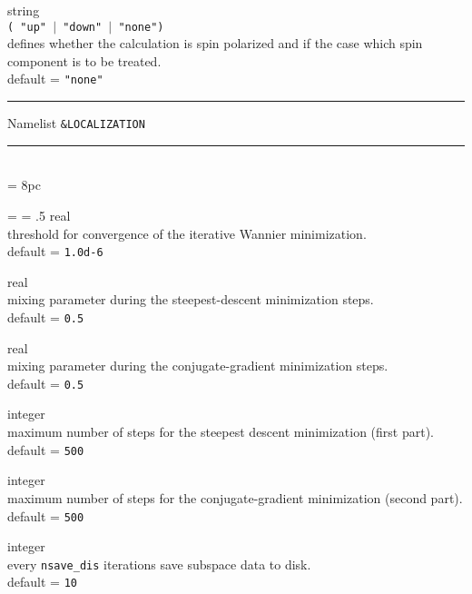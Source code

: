 {\noindent{}%
{\sc string} \\  {\tt ( "up" $\mid$ "down" $\mid$ "none")}\\
defines whether the calculation is spin polarized and if the case
which spin component is to be treated.\\ 
{\sc default} = {\tt "none"} \par
}\bigskip

\begin{centering}
\rule{2.2in}{0.01in} Namelist {\tt \&LOCALIZATION} \rule{2.2in}{0.01in}
\end{centering}\\

\newdimen\descindent \descindent = 8pc
{\noindent \leftskip = \descindent \parskip = .5\baselineskip
{}%
{\sc real} \\ threshold for convergence of the iterative Wannier minimization.
\\ {\sc default} = {\tt 1.0d-6} \par

\noindent{}%
{\sc real} \\ mixing parameter during the steepest-descent minimization steps. \\
{\sc default} = {\tt 0.5} \par

\noindent{}%
{\sc real} \\ mixing parameter during the conjugate-gradient minimization steps. \\ 
{\sc default} = {\tt 0.5} \par

\noindent{}%
{\sc integer} \\ maximum number of steps for the steepest descent 
minimization (first part).\\ {\sc default} = {\tt 500} \par

\noindent{}%
{\sc integer} \\ maximum number of steps for the conjugate-gradient minimization
(second part).\\ {\sc default} = {\tt 500 }\par

\noindent{}%
{\sc integer} \\ every {\tt nsave\_dis} iterations save subspace data to disk.\\ 
{\sc default} = {\tt 10 }\par

}
